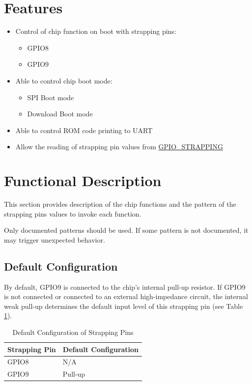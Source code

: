 \documentclass[main\_\_EN.tex]{subfiles}
\begin{document}
\section{Features}
\begin{itemize}
    \item Control of chip function on boot with strapping pins:
    \begin{itemize}
        \item GPIO8
        \item GPIO9
    \end{itemize}
    \item Able to control chip boot mode:
    \begin{itemize}
        \item SPI Boot mode
        \item Download Boot mode
    \end{itemize}
    \item Able to control ROM code printing to UART
    \item Allow the reading of strapping pin values from \hyperref[fielddesc:GPIOSTRAPPING]{GPIO\_STRAPPING}
\end{itemize}

\section{Functional Description}

This section provides description of the chip functions and the pattern of the strapping pins values to invoke each function.

\begin{importantlisting}

Only documented patterns should be used. If some pattern is not documented, it may trigger unexpected behavior.
\end{importantlisting}

\subsection{Default Configuration}
By default, GPIO9 is connected to the chip's internal pull-up resistor. If GPIO9 is not connected or connected to an external high-impedance circuit, the internal weak pull-up determines the default input level of this strapping pin (see Table \ref{tab:bootctrl-default-config-strapping-pins}).

\begin{longtable}[c]{|p{2.5cm}|p{3.5cm}|}
\caption{Default Configuration of Strapping Pins}
\label{tab:bootctrl-default-config-strapping-pins} \\
    \hline
    \rowcolor{lightgray}
  \textbf{Strapping Pin} & \textbf{Default Configuration} \\ \hline
  GPIO8 & N/A \\ \hline
  GPIO9 & Pull-up \\ \hline
\end{longtable}
\end{document}
